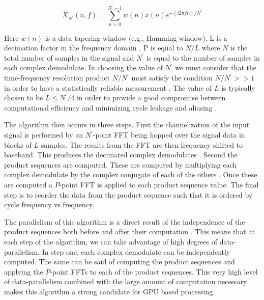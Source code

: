 \begin{equation}
X_{N^\prime}(n,f) = \sum_{n=0}^{N^\prime - 1} w(n) x(n) e^{-(i 2 \pi f n)/N^\prime}
\label{eq:ComplexDemod}
\end{equation}

Here \begin{math}w(n)\end{math} is a data tapering window (e.g., Hamming window), L is a decimation factor in the frequency domain \cite{FenChenWan08}, P is equal to \begin{math}N / L \end{math} where $N$ is the total number of samples in the signal and $N^\prime$ is equal to the number of samples in each complex demodulate.  In choosing the value of \begin{math}N^\prime \end{math} we must consider that the time-frequency resolution product \begin{math}N/N^\prime\end{math} must satisfy the condition \begin{math}N/N^\prime >> 1\end{math} in order to have a statistically reliable measurement \cite{RobBroLoo91}.  The value of $L$ is typically chosen to be \begin{math}L \le N^\prime / 4\end{math} in order to provide a good compromise between computational efficiency and minimizing cycle leakage and aliasing \cite{RobBroLoo91}.

The algorithm then occurs in three steps.  First the channelization of the input signal is performed by an $N^\prime$-point FFT being hopped over the signal data in blocks of $L$ samples.  The results from the FFT are then frequency shifted to baseband.  This produces the decimated complex demodulates \cite{RobBroLoo91}.  Second the product sequences are computed.  These are computed by multiplying each complex demodulate by the complex conjugate of each of the others \cite{Costa96}.  Once these are computed a $P$-point FFT is applied to each product sequence value.  The final step is to reorder the data from the product sequence such that it is ordered by cycle frequency vs frequency.

The parallelism of this algorithm is a direct result of the independence of the product sequences both before and after their computation \cite{RobBroLoo91}.  This means that at each step of the algorithm, we can take advantage of high degrees of data-parallelism.  In step one, each complex demodulate can be independently computed.  The same can be said of computing the product sequences and applying the $P$-point FFTs to each of the product sequences.  This very high level of data-parallelism combined with the large amount of computation necessary makes this algorithm a strong candidate for GPU based processing.


